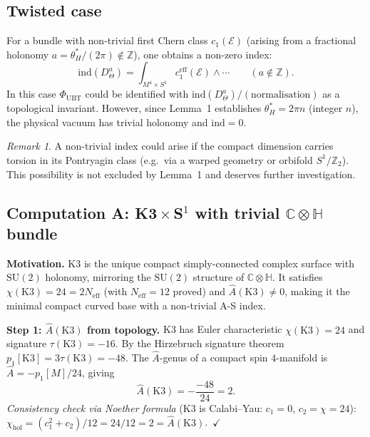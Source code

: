 \documentclass[11pt,a4paper]{article}
\theoremstyle{definition}
\theoremstyle{remark}
\newtheorem{remark}{Remark}
\begin{document}
\subsection{Twisted case}

For a bundle with non-trivial first Chern class $c_1(\mathcal{E})$
(arising from a fractional holonomy $a = \theta_H^*/(2\pi) \notin\mathbb{Z}$),
one obtains a non-zero index:
\begin{equation}
  \mathrm{ind}(D_\Theta^a) = \int_{M^4\times S^1} c_1^{\mathrm{eff}}(\mathcal{E})\wedge\cdots
  \qquad (a\notin\mathbb{Z}).
\end{equation}
In this case $\Phi_{\mathrm{UBT}}$ could be identified with
$\mathrm{ind}(D_\Theta^a) / (\text{normalisation})$ as a topological
invariant.
However, since Lemma~1 establishes $\theta_H^* = 2\pi n$ (integer $n$),
the physical vacuum has trivial holonomy and $\mathrm{ind} = 0$.

\begin{remark}
  A non-trivial index could arise if the compact dimension carries torsion
  in its Pontryagin class (e.g.\ via a warped geometry or orbifold
  $S^1/\mathbb{Z}_2$).  This possibility is not excluded by Lemma~1
  and deserves further investigation.
\end{remark}

\subsection{Computation A: K3\,$\times$\,S$^1$ with trivial
  $\mathbb{C}\otimes\mathbb{H}$ bundle}
\label{subsec:L2_compA}

\textbf{Motivation.}
K3 is the unique compact simply-connected complex surface with
$\mathrm{SU}(2)$ holonomy, mirroring the $\mathrm{SU}(2)$ structure of
$\mathbb{C}\otimes\mathbb{H}$.  It satisfies $\chi(\mathrm{K3})=24=2N_{\mathrm{eff}}$
(with $N_{\mathrm{eff}}=12$ proved) and $\hat{A}(\mathrm{K3})\neq 0$, making
it the minimal compact curved base with a non-trivial A-S index.

\textbf{Step 1: $\hat{A}(\mathrm{K3})$ from topology.}
K3 has Euler characteristic $\chi(\mathrm{K3})=24$ and signature
$\tau(\mathrm{K3})=-16$.  By the Hirzebruch signature theorem
$p_1[\mathrm{K3}] = 3\tau(\mathrm{K3}) = -48$.
The $\hat{A}$-genus of a compact spin 4-manifold is
$\hat{A} = -p_1[M]/24$, giving
\begin{equation}
  \hat{A}(\mathrm{K3}) = -\frac{-48}{24} = 2.
  \label{eq:Ahat_K3}
\end{equation}
\emph{Consistency check via Noether formula} (K3 is Calabi--Yau: $c_1=0$,
$c_2=\chi=24$):
$\chi_{\mathrm{hol}} = (c_1^2+c_2)/12 = 24/12 = 2 = \hat{A}(\mathrm{K3})$.~$\checkmark$
\end{document}
